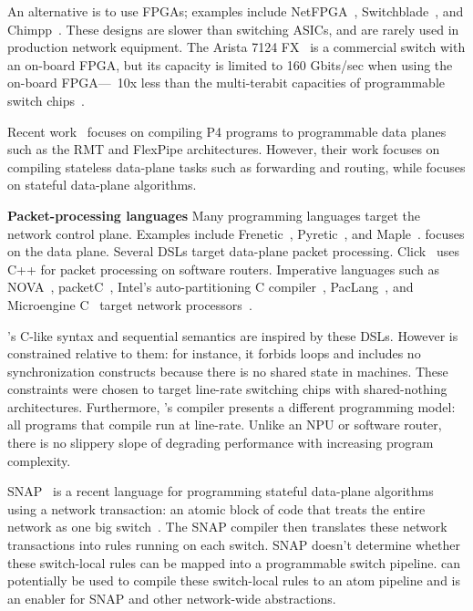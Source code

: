 An alternative is to use FPGAs; examples include NetFPGA~\cite{netfpga},
Switchblade~\cite{switchblade}, and Chimpp~\cite{chimpp}.  These designs are
slower than switching ASICs, and are rarely used in production network
equipment. The Arista 7124 FX~\cite{7124fx} is a commercial switch with an
on-board FPGA, but its capacity is limited to 160 Gbits/sec when using the
on-board FPGA---~10x less than the multi-terabit capacities of programmable
switch chips~\cite{xpliant}.

Recent work~\cite{lavanya_compiler} focuses on compiling P4 programs to
programmable data planes such as the RMT and FlexPipe architectures. However,
their work focuses on compiling stateless data-plane tasks such as forwarding
and routing, while \pktlanguage focuses on stateful data-plane algorithms.

\textbf{Packet-processing languages}
Many programming languages target the network control plane. Examples include
Frenetic~\cite{frenetic}, Pyretic~\cite{pyretic}, and Maple~\cite{maple}.
\pktlanguage focuses on the data plane. Several DSLs target data-plane packet
processing. Click~\cite{click} uses C++ for packet processing on software
routers. Imperative languages such as NOVA~\cite{nova}, packetC~\cite{packetc},
Intel's auto-partitioning C compiler~\cite{intel_uiuc_pldi},
PacLang~\cite{paclang_lang, paclang_partitioner}, and Microengine
C~\cite{microenginec, intel_ixa} target network processors~\cite{ixp2800,
ixp4xx}.

\pktlanguage's C-like syntax and sequential semantics are inspired by these
DSLs. However \pktlanguage is constrained relative to them: for instance, it
forbids loops and includes no synchronization constructs because there is no
shared state in \absmachine machines. These constraints were chosen to target
line-rate switching chips with shared-nothing architectures.  Furthermore,
\pktlanguage's compiler presents a different programming model: all
\pktlanguage programs that compile run at line-rate. Unlike an NPU or software
router, there is no slippery slope of degrading performance with increasing
program complexity.

SNAP~\cite{snap} is a recent language for programming stateful data-plane
algorithms using a network transaction: an atomic block of code that treats the
entire network as one big switch~\cite{onebigswitch}. The SNAP compiler then
translates these network transactions into rules running on each switch. SNAP
doesn't determine whether these switch-local rules can be mapped into a
programmable switch pipeline. \pktlanguage can potentially be used to compile
these switch-local rules to an atom pipeline and is an enabler for SNAP and
other network-wide abstractions.

